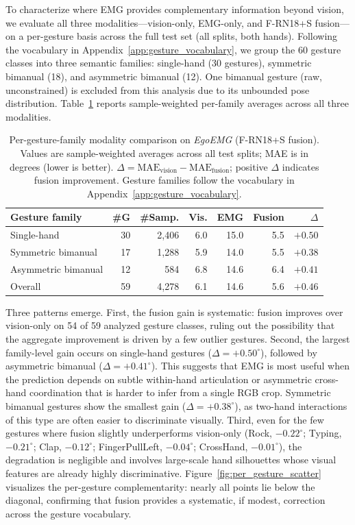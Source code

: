 \documentclass{article}
\newcommand{\dataset}{\textit{EgoEMG}}
\begin{document}
To characterize where EMG provides complementary information beyond vision,
we evaluate all three modalities---vision-only, EMG-only, and
F-RN18+S fusion---on a per-gesture basis across the full test set (all
splits, both hands). Following the vocabulary in
Appendix~\ref{app:gesture_vocabulary}, we group the 60 gesture classes into
three semantic families: single-hand (30 gestures), symmetric bimanual (18),
and asymmetric bimanual (12). One bimanual gesture (raw, unconstrained) is excluded from this analysis due to its unbounded pose distribution.
Table~\ref{tab:per_gesture_family} reports
sample-weighted per-family averages across all three modalities.

\begin{table}[h]
\centering
\caption{Per-gesture-family modality comparison on \dataset{} (F-RN18+S fusion). Values are sample-weighted averages across all test splits; MAE is in degrees (lower is better). $\Delta = \text{MAE}_\text{vision} - \text{MAE}_\text{fusion}$; positive $\Delta$ indicates fusion improvement. Gesture families follow the vocabulary in Appendix~\ref{app:gesture_vocabulary}.}
\label{tab:per_gesture_family}
\footnotesize
\setlength{\tabcolsep}{3.8pt}
\renewcommand{\arraystretch}{1.08}
\begin{tabular}{lrrrrrr}
\toprule
Gesture family & \#G & \#Samp. & Vis. & EMG & Fusion & $\Delta$ \\
\midrule
Single-hand & 30 & 2,406 & 6.0 & 15.0 & 5.5 & $\mathbf{+0.50}$ \\
Symmetric bimanual & 17 & 1,288 & 5.9 & 14.0 & 5.5 & $+0.38$ \\
Asymmetric bimanual & 12 & 584 & 6.8 & 14.6 & 6.4 & $+0.41$ \\
\midrule
Overall & 59 & 4,278 & 6.1 & 14.6 & 5.6 & $+0.46$ \\
\bottomrule
\end{tabular}
\end{table}

Three patterns emerge. First, the fusion gain is systematic: fusion
improves over vision-only on 54 of 59 analyzed gesture classes, ruling out the
possibility that the aggregate improvement is driven by a few outlier
gestures. Second, the largest family-level gain occurs on single-hand
gestures ($\Delta = +0.50^\circ$), followed by asymmetric bimanual
($\Delta = +0.41^\circ$). This suggests that EMG is most useful
when the prediction depends on subtle within-hand articulation or asymmetric
cross-hand coordination that is harder to infer from a single RGB crop.
Symmetric bimanual gestures show the smallest gain ($\Delta = +0.38^\circ$),
as two-hand interactions of this type are often easier to discriminate
visually. Third, even for the few gestures where fusion slightly
underperforms vision-only (Rock, $-0.22^\circ$; Typing, $-0.21^\circ$;
Clap, $-0.12^\circ$; FingerPullLeft, $-0.04^\circ$; CrossHand, $-0.01^\circ$), the degradation is negligible and involves
large-scale hand silhouettes whose visual features are already highly
discriminative. Figure~\ref{fig:per_gesture_scatter} visualizes the
per-gesture complementarity: nearly all points lie below the diagonal,
confirming that fusion provides a systematic, if modest, correction
across the gesture vocabulary.
\end{document}
